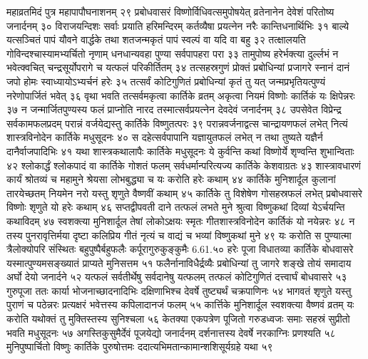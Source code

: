 महाव्रतमिदं पुत्र महापापौघनाशनम् २९
प्रबोधवासरं विष्णोर्विधिवत्समुपोषयेत् 
व्रतेनानेन देवेशं परितोष्य जनार्दनम् ३०
विराजयन्दिशः सर्वाः प्रयाति हरिमन्दिरम् 
कर्तव्यैषा प्रयत्नेन नरैः कान्तिधनार्थिभिः ३१
बाल्ये यत्सञ्चितं पापं यौवने वार्द्धके तथा 
शतजन्मकृतं पापं स्वल्पं वा यदि वा बहु ३२
तत्क्षालयति गोविन्दश्चास्यामभ्यर्चितो नृणाम् 
धनधान्यवहा पुण्या सर्वपापहरा परा ३३
तामुपोष्य हरेर्भक्त्या दुर्ल्लभं न भवेत्क्वचित् 
चन्द्रसूर्योपरागे च यत्फलं परिकीर्तितम् ३४
तत्सहस्रगुणं प्रोक्तं प्रबोधिन्यां प्रजागरे 
स्नानं दानं जपो होमः स्वाध्यायोऽभ्यर्चनं हरेः ३५
तत्सर्वं कोटिगुणितं प्रबोधिन्यां कृतं तु यत् 
जन्मप्रभृतियत्पुण्यं नरेणोपार्जितं भवेत् ३६
वृथा भवति तत्सर्वमकृत्वा कार्तिके व्रतम् 
अकृत्वा नियमं विष्णोः कार्तिकं यः क्षिपेन्नरः ३७
न जन्मार्जितपुण्यस्य फलं प्राप्नोति नारद 
तस्मात्सर्वप्रयत्नेन देवदेवं जनार्दनम् ३८
उपसेवेत विप्रेन्द्र सर्वकामफलप्रदम् 
परान्नं वर्जयेद्यस्तु कार्तिके विष्णुतत्परः ३९
परान्नवर्जनाद्वत्स चान्द्रायणफलं लभेत् 
नित्यं शास्त्रविनोदेन कार्तिके मधुसूदनः ४०
स दहेत्सर्वपापानि यज्ञायुतफलं लभेत् 
न तथा तुष्यते यज्ञैर्न दानैर्वाजपादिभिः ४१
यथा शास्त्रकथालापैः कार्तिके मधुसूदनः 
ये कुर्वन्ति कथां विष्णोर्ये शृण्वन्ति शुभान्विताः ४२
श्लोकार्द्धं श्लोकपादं वा कार्तिके गोशतं फलम् 
सर्वधर्मान्परित्यज्य कार्तिके केशवाग्रतः ४३
शास्त्रावधारणं कार्यं श्रोतव्यं च महामुने 
श्रेयसा लोभबुद्ध्या च यः करोति हरेः कथाम् ४४
कार्तिके मुनिशार्दूल कुलानां तारयेच्छतम् 
नियमेन नरो यस्तु शृणुते वैष्णवीं कथाम् ४५
कार्तिके तु विशेषेण गोसहस्रफलं लभेत् 
प्रबोधवासरे विष्णोः शृणुते यो हरेः कथाम् ४६
सप्तद्वीपवती दाने तत्फलं लभते मुने 
श्रुत्वा विष्णुकथां दिव्यां येऽर्चयन्ति कथाविदम् ४७
स्वशक्त्या मुनिशार्दूल तेषां लोकोऽक्षयः स्मृतः 
गीतशास्त्रविनोदेन कार्तिकं यो नयेन्नरः ४८
न तस्य पुनरावृत्तिर्मया दृष्टा कलिप्रिय 
गीतं नृत्यं च वाद्यं च भव्यां विष्णुकथां मुने ४९
यः करोति स पुण्यात्मा त्रैलोक्योपरि संस्थितः 
बहुपुष्पैर्बहुफलैः कर्पूरागुरुकुङ्कुमैः 6.61.५०
हरेः पूजा विधातव्या कार्तिके बोधवासरे 
यस्मात्पुण्यमसङ्ख्यातं प्राप्यते मुनिसत्तम ५१
फलैर्नानाविधैर्द्रव्यैः प्रबोधिन्यां तु जागरे 
शङ्खे तोयं समादाय अर्घो देयो जनार्दने ५२
यत्फलं सर्वतीर्थेषु सर्वदानेषु यत्फलम् 
तत्फलं कोटिगुणितं दत्त्वार्घं बोधवासरे ५३
गुरुपूजा ततः कार्या भोजनाच्छादनादिभिः 
दक्षिणाभिश्च देवर्षे तुष्ट्यर्थं चक्रपाणिनः ५४
भागवतं शृणुते यस्तु पुराणं च पठेन्नरः 
प्रत्यक्षरं भवेत्तस्य कपिलादानजं फलम् ५५
कार्त्तिके मुनिशार्दूल स्वशक्त्या वैष्णवं व्रतम् 
यः करोति यथोक्तं तु मुक्तिस्तस्य सुनिश्चला ५६
केतक्या एकपत्रेण पूजितो गरुडध्वजः 
समाः सहस्रं सुप्रीतो भवति मधुसूदनः ५७
अगस्तिकुसुमैर्देवं पूजयेद्यो जनार्दनम् 
दर्शनात्तस्य देवर्षे नरकाग्निः प्रणश्यति ५८
मुनिपुष्पार्चितो विष्णुः कार्तिके पुरुषोत्तमः 
ददात्यभिमतान्कामान्शशिसूर्यग्रहे यथा ५९
